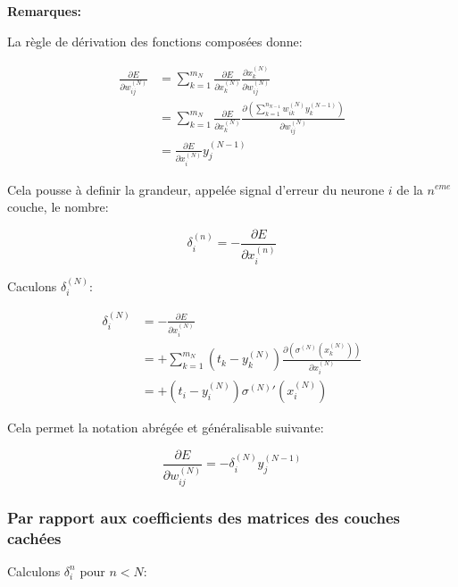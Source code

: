 \documentclass[11pt]{article}
\begin{document}
\textbf{Remarques:}

La règle de dérivation des fonctions composées donne:

\begin{align}
\frac{\partial E}{\partial w_{ij}^{(N)}}
& = \sum_{k=1}^{m_{N}}\frac{\partial E}{\partial x_{k}^{(N)}}
\frac{\partial x_{k}^{(N)}}{\partial w_{ij}^{(N)}}\\
& = \sum_{k=1}^{m_{N}}\frac{\partial E}{\partial x_{k}^{(N)}}
\frac{\partial (\sum_{k=1}^{n_{N-1}}w_{ik}^{(N)}y_{k}^{(N-1)})}
{\partial w_{ij}^{(N)}}\\
& = \frac{\partial E}{\partial x_{i}^{(N)}}y_{j}^{(N-1)}
\end{align}

Cela pousse à definir la grandeur, appelée signal d'erreur du neurone $i$ de la
$n^{eme}$ couche, le nombre:

\begin{equation}
\delta_{i}^{(n)}=-\frac{\partial E}{\partial x_{i}^{(n)}}
\end{equation}

Caculons $\delta_{i}^{(N)}$:

\begin{align}
\delta_{i}^{(N)}
& = -\frac{\partial E}{\partial x_{i}^{(N)}}\\
& = +\sum_{k=1}^{m_{N}}(t_{k}-y_{k}^{(N)})
\frac{\partial (\sigma^{(N)}(x_{k}^{(N)}))}{\partial x_{i}^{(N)}}\\
& = +(t_{i}-y_{i}^{(N)})\sigma^{(N)}'(x_{i}^{(N)})
\end{align}

Cela permet la notation abrégée et généralisable suivante:

\begin{equation}
\frac{\partial E}{\partial w_{ij}^{(N)}}
= -\delta_{i}^{(N)}y_{j}^{(N-1)}
\end{equation}

\subsubsection{Par rapport aux coefficients des matrices des couches cachées}
\label{sec-5-3-2}

Calculons $\delta_{i}^{n}$ pour $n<N$:
\end{document}
